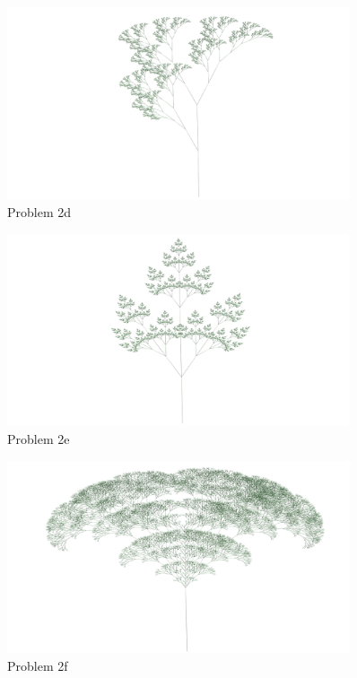 \begin{figure}[H]
\centering
\noindent\includegraphics[width=0.90\textwidth]{figures/L-systems/d}
\caption{Problem 2d}
\label{fig:prob2d}
\end{figure}

\begin{figure}[H]
\centering
\noindent\includegraphics[width=0.90\textwidth]{figures/L-systems/e}
\caption{Problem 2e}
\label{fig:prob2e}
\end{figure}

\begin{figure}[H]
\centering
\noindent\includegraphics[width=0.90\textwidth]{figures/L-systems/f}
\caption{Problem 2f}
\label{fig:prob2f}
\end{figure}

